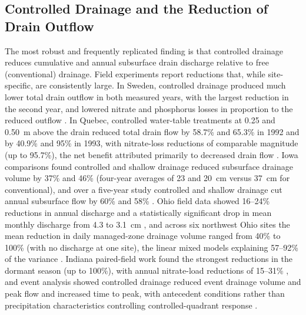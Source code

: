 \subsection{Controlled Drainage and the Reduction of Drain Outflow}

The most robust and frequently replicated finding is that controlled drainage
reduces cumulative and annual subsurface drain discharge relative to free
(conventional) drainage. Field experiments report reductions that, while
site-specific, are consistently large. In Sweden, controlled drainage produced
much lower total drain outflow in both measured years, with the largest
reduction in the second year, and lowered nitrate and phosphorus losses in
proportion to the reduced outflow \parencite{Wesström2001,Wesström2007}. In
Quebec, controlled water-table treatments at 0.25 and 0.50~m above the drain
reduced total drain flow by 58.7\% and 65.3\% in 1992 and by 40.9\% and 95\% in
1993, with nitrate-loss reductions of comparable magnitude (up to 95.7\%), the
net benefit attributed primarily to decreased drain flow
\parencite{Lalonde1996}. Iowa comparisons found controlled and shallow drainage
reduced subsurface drainage volume by 37\% and 46\% (four-year averages of 23
and 20~cm versus 37~cm for conventional), and over a five-year study controlled
and shallow drainage cut annual subsurface flow by 60\% and 58\%
\parencite{Helmers2012,Schott2017}. Ohio field data showed 16--24\% reductions
in annual discharge and a statistically significant drop in mean monthly
discharge from 4.3 to 3.1~cm \parencite{Pease2017}, and across six northwest
Ohio sites the mean reduction in daily managed-zone drainage volume ranged from
40\% to 100\% (with no discharge at one site), the linear mixed models
explaining 57--92\% of the variance \parencite{Gunn2015}. Indiana paired-field
work found the strongest reductions in the dormant season (up to 100\%), with
annual nitrate-load reductions of 15--31\% \parencite{Adeuya2012}, and event
analysis showed controlled drainage reduced event drainage volume and peak flow
and increased time to peak, with antecedent conditions rather than precipitation
characteristics controlling controlled-quadrant response \parencite{Lahdou2019}.

